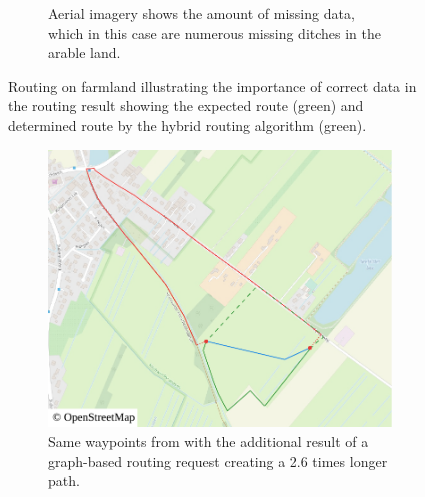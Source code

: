 \begin{figure}[h!]
\begin{minipage}[t]{.48\textwidth}
\begin{subfigure}[t]{\linewidth}
						\caption{Aerial imagery shows the amount of missing data, which in this case are numerous missing ditches in the arable land.}
						\label{fig:eval-rural-routing-6-aerial}
					\end{subfigure}
				\end{minipage}
				\caption{Routing on farmland illustrating the importance of correct data in the routing result showing the expected route (green) and determined route by the hybrid routing algorithm (green).}
				\label{fig:eval-rural-routing-6}
			\end{figure}
			
			\begin{figure}[h!]
				\begin{minipage}[t]{.48\textwidth}
					\begin{subfigure}[t]{\linewidth}
						\includegraphics[width=\textwidth]{images/qgis-routing-rural-routing-6-graph-based}
						\caption{Same waypoints from  with the additional result of a graph-based routing request creating a 2.6 times longer path.}
						\label{fig:eval-rural-graph-based-comparison-6}
					\end{subfigure}
				\end{minipage}
				\hfill
				\begin{minipage}[t]{.48\textwidth}
					\begin{subfigure}[t]{\linewidth}

\end{subfigure}
\end{minipage}
\end{figure}
